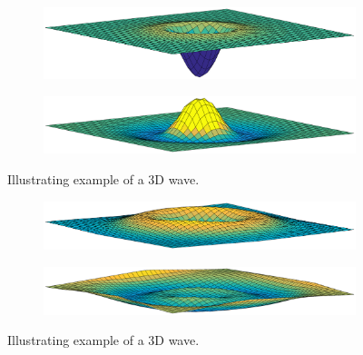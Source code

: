 \documentclass[11pt]{article}
\begin{document}
\begin{figure}[!h]
\centering
\begin{subfigure}[b]{\textwidth}
\includegraphics[width=\textwidth]{fig/3dv2_1.eps}
\label{fig1}
\end{subfigure}
\begin{subfigure}[b]{\textwidth}
\includegraphics[width=\textwidth]{fig/3dv2_2.eps}
\label{fig1}
\end{subfigure}
\caption{Illustrating example of a 3D wave.}
\end{figure}
\clearpage
\begin{figure}
\begin{subfigure}[b]{\textwidth}
\includegraphics[width=\textwidth]{fig/3dv2_3.eps}
\label{fig1}
\end{subfigure}
\begin{subfigure}[b]{\textwidth}
\includegraphics[width=\textwidth]{fig/3dv2_5.eps}
\label{fig1}
\end{subfigure}
\caption{Illustrating example of a 3D wave.}
\label{fig:3dWave}
\end{figure}
\end{document}
